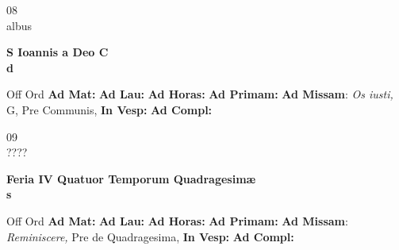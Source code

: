 \documentclass[10pt, openany]{book}
\begin{document}
    \begin{center}
        \begin{minipage}{3.5in}
            \vspace{2em}
            \begin{minipage}{0.5in}
                {\Huge 08} \\
                {\normalsize albus}
            \end{minipage}
            \begin{minipage}{3.0in}
                \textbf{ \large S Ioannis a Deo C \\
                \textnormal{\normalsize d}}

            \end{minipage}
            \begin{justify}Off Ord
                \textbf{Ad Mat: }
                \textbf{Ad Lau: }
                \textbf{Ad Horas: }
                \textbf{Ad Primam: }\textbf{Ad Missam}: \textit{Os iusti,} G, Pre Communis, 
                \textbf{In Vesp: }
                \textbf{Ad Compl: }
            \end{justify}
        \end{minipage}
    \end{center}

    \begin{center}
        \begin{minipage}{3.5in}
            \vspace{2em}
            \begin{minipage}{0.5in}
                {\Huge 09} \\
                {\normalsize ????}
            \end{minipage}
            \begin{minipage}{3.0in}
                \textbf{ \large Feria IV Quatuor Temporum Quadragesimæ \\
                \textnormal{\normalsize s}}

            \end{minipage}
            \begin{justify}Off Ord
                \textbf{Ad Mat: }
                \textbf{Ad Lau: }
                \textbf{Ad Horas: }
                \textbf{Ad Primam: }\textbf{Ad Missam}: \textit{Reminiscere,} Pre de Quadragesima, 
                \textbf{In Vesp: }
                \textbf{Ad Compl: }
            \end{justify}
        \end{minipage}
    \end{center}
\end{document}
